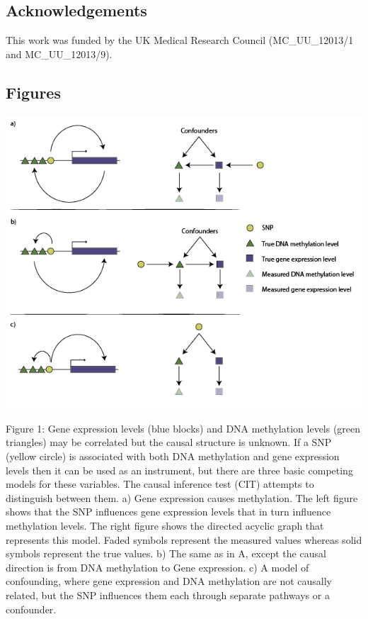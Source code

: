 \documentclass[]{article}
\begin{document}
\subsection{Acknowledgements}\label{acknowledgements}

This work was funded by the UK Medical Research Council (MC\_UU\_12013/1
and MC\_UU\_12013/9).

\newpage

\subsection{Figures}\label{figures}

\includegraphics{../images/dag-01.png}

Figure 1: Gene expression levels (blue blocks) and DNA methylation
levels (green triangles) may be correlated but the causal structure is
unknown. If a SNP (yellow circle) is associated with both DNA
methylation and gene expression levels then it can be used as an
instrument, but there are three basic competing models for these
variables. The causal inference test (CIT) attempts to distinguish
between them. a) Gene expression causes methylation. The left figure
shows that the SNP influences gene expression levels that in turn
influence methylation levels. The right figure shows the directed
acyclic graph that represents this model. Faded symbols represent the
measured values whereas solid symbols represent the true values. b) The
same as in A, except the causal direction is from DNA methylation to
Gene expression. c) A model of confounding, where gene expression and
DNA methylation are not causally related, but the SNP influences them
each through separate pathways or a confounder.
\end{document}
